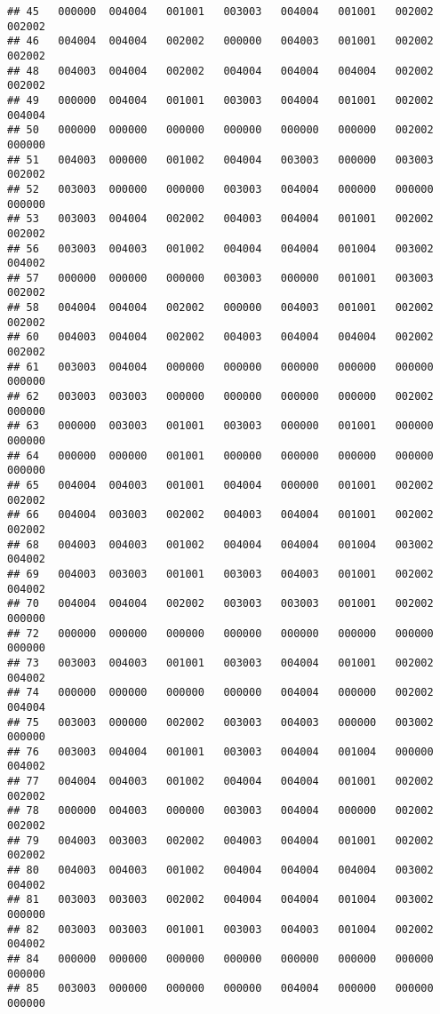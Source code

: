 \documentclass[
]{article}
\begin{document}
\begin{verbatim}
## 45   000000  004004   001001   003003   004004   001001   002002   002002
## 46   004004  004004   002002   000000   004003   001001   002002   002002
## 48   004003  004004   002002   004004   004004   004004   002002   002002
## 49   000000  004004   001001   003003   004004   001001   002002   004004
## 50   000000  000000   000000   000000   000000   000000   002002   000000
## 51   004003  000000   001002   004004   003003   000000   003003   002002
## 52   003003  000000   000000   003003   004004   000000   000000   000000
## 53   003003  004004   002002   004003   004004   001001   002002   002002
## 56   003003  004003   001002   004004   004004   001004   003002   004002
## 57   000000  000000   000000   003003   000000   001001   003003   002002
## 58   004004  004004   002002   000000   004003   001001   002002   002002
## 60   004003  004004   002002   004003   004004   004004   002002   002002
## 61   003003  004004   000000   000000   000000   000000   000000   000000
## 62   003003  003003   000000   000000   000000   000000   002002   000000
## 63   000000  003003   001001   003003   000000   001001   000000   000000
## 64   000000  000000   001001   000000   000000   000000   000000   000000
## 65   004004  004003   001001   004004   000000   001001   002002   002002
## 66   004004  003003   002002   004003   004004   001001   002002   002002
## 68   004003  004003   001002   004004   004004   001004   003002   004002
## 69   004003  003003   001001   003003   004003   001001   002002   004002
## 70   004004  004004   002002   003003   003003   001001   002002   000000
## 72   000000  000000   000000   000000   000000   000000   000000   000000
## 73   003003  004003   001001   003003   004004   001001   002002   004002
## 74   000000  000000   000000   000000   004004   000000   002002   004004
## 75   003003  000000   002002   003003   004003   000000   003002   000000
## 76   003003  004004   001001   003003   004004   001004   000000   004002
## 77   004004  004003   001002   004004   004004   001001   002002   002002
## 78   000000  004003   000000   003003   004004   000000   002002   002002
## 79   004003  003003   002002   004003   004004   001001   002002   002002
## 80   004003  004003   001002   004004   004004   004004   003002   004002
## 81   003003  003003   002002   004004   004004   001004   003002   000000
## 82   003003  003003   001001   003003   004003   001004   002002   004002
## 84   000000  000000   000000   000000   000000   000000   000000   000000
## 85   003003  000000   000000   000000   004004   000000   000000   000000

\end{verbatim}
\end{document}
